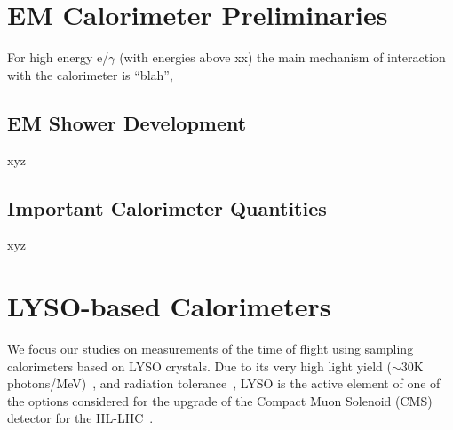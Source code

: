 \section{EM Calorimeter Preliminaries}\label{prelim-cal}
For high energy e/$\gamma$ (with energies above xx\GeV) the main
mechanism of interaction with the calorimeter is ``blah'', 
\subsection{EM Shower Development}
xyz
\subsection{Important Calorimeter Quantities}
 xyz
\section{LYSO-based Calorimeters}\label{lyso-cal}
We focus our studies on measurements of the time of flight using sampling calorimeters 
based on LYSO crystals. Due to its very high light yield 
($\sim 30$K photons/MeV)~\cite{LYSOProperties}, and radiation 
tolerance~\cite{5402126, 4291695, 5402125, Dissertori:2013rma}, LYSO
is the active element of one of the options considered for the upgrade of the
Compact Muon Solenoid (CMS) detector for the HL-LHC~\cite{Contardo:1605208}. 

